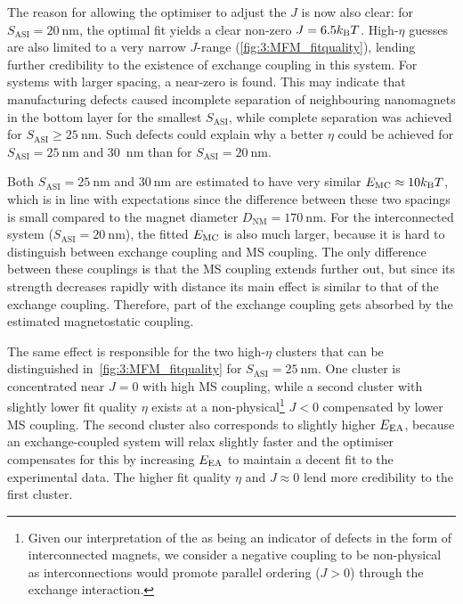 The reason for allowing the optimiser to adjust the  $J$ is now also clear: for $S_\mathrm{ASI} = \SI{20}{\nano\metre}$, the optimal fit yields a clear non-zero $J = 6.5 \kBT$.
High-$\eta$ guesses are also limited to a very narrow $J$-range (\cref{fig:3:MFM_fitquality}), lending further credibility to the existence of exchange coupling in this system.
For systems with larger spacing, a near-zero  is found.
This may indicate that manufacturing defects caused incomplete separation of neighbouring nanomagnets in the bottom  layer for the smallest $S_\mathrm{ASI}$, while complete separation was achieved for $S_\mathrm{ASI} \geq \SI{25}{\nano\metre}$.
Such defects could explain why a better  $\eta$ could be achieved for $S_\mathrm{ASI} = \SI{25}{\nano\metre}$ and \SI{30}{\nano\metre} than for $S_\mathrm{ASI} = \SI{20}{\nano\metre}$. \par
Both $S_\mathrm{ASI} = \SI{25}{\nano\metre}$ and $\SI{30}{\nano\metre}$ are estimated to have very similar $\EMC \approx 10 \kBT$, which is in line with expectations since the difference between these two spacings is small compared to the magnet diameter $D_\mathrm{NM} = \SI{170}{\nano\metre}$.
For the interconnected system ($S_\mathrm{ASI} = \SI{20}{\nano\metre}$), the fitted  $E_\mathrm{MC}$ is also much larger, because it is hard to distinguish between exchange coupling and MS coupling.
The only difference between these couplings is that the MS coupling extends further out, but since its strength decreases rapidly with distance its main effect is similar to that of the exchange coupling.
Therefore, part of the exchange coupling gets absorbed by the estimated magnetostatic coupling. \par
The same effect is responsible for the two high-$\eta$ clusters that can be distinguished in~\cref{fig:3:MFM_fitquality} for $S_\mathrm{ASI} = \SI{25}{\nano\metre}$.
One cluster is concentrated near $J=0$ with high MS coupling, while a second cluster with slightly lower fit quality $\eta$ exists at a non-physical\footnote{
	Given our interpretation of the  as being an indicator of defects in the form of interconnected magnets, we consider a negative coupling to be non-physical as interconnections would promote parallel ordering ($J > 0$) through the  exchange interaction.
} $J < 0$ compensated by lower MS coupling.
The second cluster also corresponds to slightly higher $E_\mathrm{EA}$, because an exchange-coupled system will relax slightly faster and the optimiser compensates for this by increasing $E_\mathrm{EA}$ to maintain a decent fit to the experimental data.
The higher fit quality $\eta$ and $J \approx 0$ lend more credibility to the first cluster. \\\par

